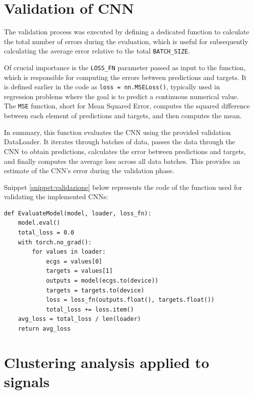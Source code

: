 \documentclass[12pt,english]{report}
\begin{document}
\section{Validation of CNN}
\label{sec:validazione}

The validation process was executed by defining a dedicated function to calculate the total number of errors during the evaluation, which is useful for subsequently calculating the average error relative to the total \texttt{BATCH\_SIZE}.

Of crucial importance is the \texttt{LOSS\_FN} parameter passed as input to the function, which is responsible for computing the errors between predictions and targets. It is defined earlier in the code as \texttt{loss = nn.MSELoss()}, typically used in regression problems where the goal is to predict a continuous numerical value. The \texttt{MSE} function, short for Mean Squared Error, computes the squared difference between each element of predictions and targets, and then computes the mean.

In summary, this function evaluates the CNN using the provided validation DataLoader. It iterates through batches of data, passes the data through the CNN to obtain predictions, calculates the error between predictions and targets, and finally computes the average loss across all data batches. This provides an estimate of the CNN's error during the validation phase.

Snippet \ref{snippet:validazione} below represents the code of the function used for validating the implemented CNNs:

\lstset{language=Python}
\begin{lstlisting}[aboveskip=15pt, belowskip=15pt, basicstyle=\fontsize{8}{10}\selectfont, keywordstyle=\color{blue}, breaklines=true, label=snippet:validazione]
def EvaluateModel(model, loader, loss_fn):
    model.eval()
    total_loss = 0.0
    with torch.no_grad():
        for values in loader:
            ecgs = values[0]
            targets = values[1]
            outputs = model(ecgs.to(device))
            targets = targets.to(device)
            loss = loss_fn(outputs.float(), targets.float())
            total_loss += loss.item()
    avg_loss = total_loss / len(loader)
    return avg_loss
\end{lstlisting}

\section{Clustering analysis applied to signals}
\label{sec:clustering}
\end{document}

